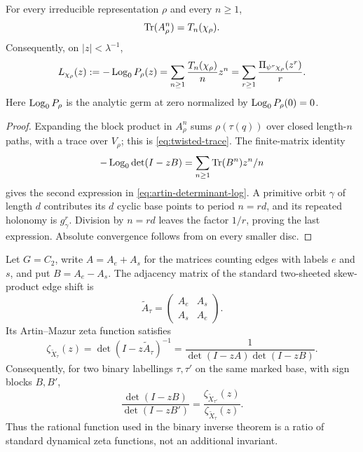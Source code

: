 \begin{lemma}\label{lem:trace-log}
For every irreducible representation \(\rho\) and every \(n\geq1\),
\begin{equation}\label{eq:twisted-trace}
  \operatorname{Tr}(A_\rho^n)=T_n(\chi_\rho).
\end{equation}
Consequently, on \(|z|<\lambda^{-1}\),
\begin{equation}\label{eq:artin-determinant-log}
  L_{\chi_\rho}(z):=-\operatorname{Log}_0P_\rho(z)
  =\sum_{n\geq1}\frac{T_n(\chi_\rho)}{n}z^n
  =\sum_{r\geq1}\frac{\Pi_{\psi^r\chi_\rho}(z^r)}{r}.
\end{equation}
Here \(\operatorname{Log}_0P_\rho\) is the analytic germ at zero normalized by
\(\operatorname{Log}_0P_\rho(0)=0\).
\end{lemma}

\begin{proof}
Expanding the block product in \(A_\rho^n\) sums \(\rho(\tau(q))\) over
closed length-\(n\) paths, with a trace over \(V_\rho\); this is
  \eqref{eq:twisted-trace}.  The finite-matrix identity
\[
  -\operatorname{Log}_0\det(I-zB)=\sum_{n\geq1}\operatorname{Tr}(B^n)z^n/n
\]
gives the second expression in \eqref{eq:artin-determinant-log}.  A primitive
orbit \(\gamma\) of length \(d\) contributes its \(d\) cyclic base points to
period \(n=rd\), and its repeated holonomy is \(g_\gamma^r\).  Division by
  \(n=rd\) leaves the factor \(1/r\), proving the last expression.  Absolute
  convergence follows from  on every
  smaller disc.
\end{proof}

\begin{proposition}
\label{prop:c2-standard-zeta-ratio}
Let \(G=C_2\), write \(A=A_e+A_s\) for the matrices counting edges with
labels \(e\) and \(s\), and put \(B=A_e-A_s\).  The adjacency matrix of the
standard two-sheeted skew-product edge shift is
\[
 \widetilde A_\tau=
 \begin{pmatrix}A_e&A_s\\ A_s&A_e\end{pmatrix}.
\]
Its Artin--Mazur zeta function satisfies
\begin{equation}\label{eq:c2-cover-zeta-factorization}
 \zeta_{\widetilde X_\tau}(z)
 =\det(I-z\widetilde A_\tau)^{-1}
 =\frac{1}{\det(I-zA)\det(I-zB)}.
\end{equation}
Consequently, for two binary labellings \(\tau,\tau'\) on the same marked
base, with sign blocks \(B,B'\),
\begin{equation}\label{eq:c2-standard-zeta-ratio}
 \frac{\det(I-zB)}{\det(I-zB')}
 =\frac{\zeta_{\widetilde X_{\tau'}}(z)}
        {\zeta_{\widetilde X_\tau}(z)}.
\end{equation}
Thus the rational function used in the binary inverse theorem is a ratio of
standard dynamical zeta functions, not an additional invariant.
\end{proposition}

